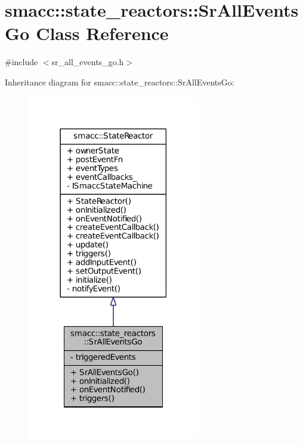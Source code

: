 \hypertarget{classsmacc_1_1state__reactors_1_1SrAllEventsGo}{}\section{smacc\+:\+:state\+\_\+reactors\+:\+:Sr\+All\+Events\+Go Class Reference}
\label{classsmacc_1_1state__reactors_1_1SrAllEventsGo}


{\ttfamily \#include $<$sr\+\_\+all\+\_\+events\+\_\+go.\+h$>$}



Inheritance diagram for smacc\+:\+:state\+\_\+reactors\+:\+:Sr\+All\+Events\+Go\+:
\nopagebreak
\begin{figure}[H]
\begin{center}
\leavevmode
\includegraphics[width=213pt]{classsmacc_1_1state__reactors_1_1SrAllEventsGo__inherit__graph}
\end{center}
\end{figure}



